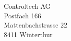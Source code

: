 \documentclass[psilabel]{scrlttr2}
\begin{document}
 
\begin{letter}{%
    Controltech AG\\
	Postfach 166\\
	Mattenbachstrasse 22\\
	8411 Winterthur
}
\opening{}
\end{letter}
\end{document}
